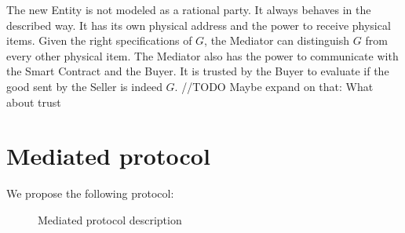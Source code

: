 \documentclass{cacthesis}
\begin{document}
The new Entity is not modeled as a rational party. It always behaves in the described way. It has its own physical address and the power to receive physical items. Given the right specifications of $G$, the Mediator can distinguish $G$ from every other  physical item. The Mediator also has the power to communicate with the Smart Contract and the Buyer. It is trusted by the Buyer to evaluate if the good sent by the Seller is indeed $G$.
//TODO Maybe expand on that: What about trust
\section{Mediated protocol}
We propose the following protocol:
\begin{figure}[htb!]
    \centering
    \caption{Mediated protocol description}
    \label{pro:mediated-protocol}
\end{figure}
\end{document}
